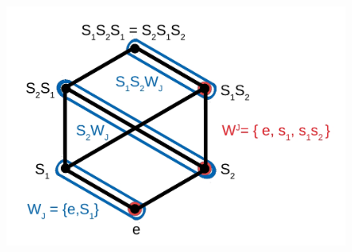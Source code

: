 \documentclass[envcountsame,envcountchap]{svmono}
\begin{document}
\begin{figure}[h]
		\centering
		\includegraphics[scale=0.2]{Coxetergroupimagediamand.JPG}
\end{figure}
\end{document}

